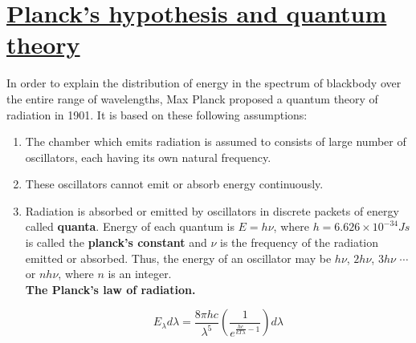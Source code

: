 \documentclass[16pt,a4paper]{article}
\begin{document}
\section{\underline{Planck's hypothesis and quantum theory}}
In order to explain the distribution of energy in the spectrum of blackbody over the entire range of wavelengths, Max Planck proposed a quantum theory of radiation in 1901. It is based on these following assumptions:
\begin{enumerate}
    \item The chamber which emits radiation is assumed to consists of large number of oscillators, each having its own natural frequency.
    \item These oscillators cannot emit or absorb energy continuously.
    \item Radiation is absorbed or emitted by oscillators in discrete packets of energy called  \textbf{quanta}. Energy of each quantum is $E = h\nu$, where $h = 6.626 \times 10^{-34} Js$ is called the \textbf{planck's constant} and $\nu$ is the frequency of the radiation emitted or absorbed. Thus, the energy of an oscillator may be $h\nu$, $2h\nu$, $3h\nu$ $\cdots$ or $nh\nu$, where $n$ is an integer.
    \\
    \textbf{The Planck's law of radiation.}
    \begin{Large}\begin{equation}
        E_{\lambda} d\lambda = \frac{8\pi hc}{\lambda^{5}} \left( \frac{1}{e^{\frac{hc} {kT \lambda} -1 } }  \right)d\lambda
    \end{equation}
    \end{Large}
\end{enumerate}
\end{document}
